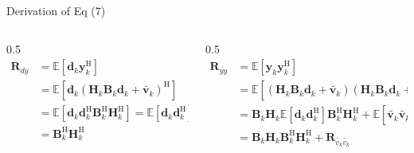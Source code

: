 \documentclass[aspectratio=169, 10pt]{beamer}
\begin{document}
\begin{frame}{Derivation of Eq (7)}
    \begin{columns}
        \begin{column}{0.5\textwidth}
            \begin{align*}
                \mathbf{R}_{dy} &
                =  \mathbb{E}\left[\mathbf{d}_k \mathbf{y}_k^\mathrm{H}\right]                 \\
                                & = \mathbb{E}\left[
                    \mathbf{d}_k \left(
                    \mathbf{H}_k \mathbf{B}_k \mathbf{d}_k  + \tilde{\mathbf{v}_k}
                    \right)^\mathrm{H}
                \right]                                                                        \\
                                & = \mathbb{E}\left[
                    \mathbf{d}_k
                    \mathbf{d}_k^\mathrm{H} \mathbf{B}_k^\mathrm{H} \mathbf{H}_k^\mathrm{H}
                    \right] = \mathbb{E}\left[
                    \mathbf{d}_k
                \mathbf{d}_k^\mathrm{H} \right]\mathbf{B}_k^\mathrm{H} \mathbf{H}_k^\mathrm{H} \\
                                & = \mathbf{B}_k^\mathrm{H} \mathbf{H}_k^\mathrm{H}
            \end{align*}

        \end{column}
        \begin{column}{0.5\textwidth}
            \begin{align*}
                \mathbf{R}_{yy} &
                =  \mathbb{E}\left[\mathbf{y}_k \mathbf{y}_k^\mathrm{H}\right] \\
                                & = \mathbb{E}\left[
                    \left(\mathbf{H}_k \mathbf{B}_k \mathbf{d}_k  + \tilde{\mathbf{v}_k}\right)
                    \left(
                    \mathbf{H}_k \mathbf{B}_k \mathbf{d}_k  + \tilde{\mathbf{v}_k}
                    \right)^\mathrm{H}
                \right]                                                        \\
                                & = \mathbf{B}_k \mathbf{H}_k
                \mathbb{E}\left[
                    \mathbf{d}_k \mathbf{d}_k^\mathrm{H} \right]
                \mathbf{B}_k^\mathrm{H} \mathbf{H}_k^\mathrm{H} +
                \mathbb{E}\left[
                \tilde{\mathbf{v}_k} \tilde{\mathbf{v}_k}^\mathrm{H} \right]   \\
                                & = \mathbf{B}_k \mathbf{H}_k
                \mathbf{B}_k^\mathrm{H} \mathbf{H}_k^\mathrm{H} +
                \mathbf{R}_{\tilde{v_k}\tilde{v_k}}
            \end{align*}
        \end{column}
    \end{columns}


\end{frame}
\end{document}
